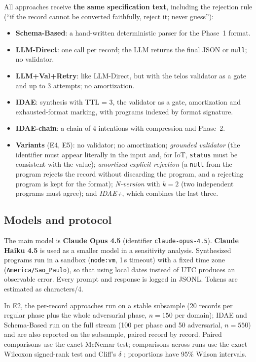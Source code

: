 \documentclass[sigconf,nonacm]{acmart}
\begin{document}
All approaches receive \textbf{the same specification text}, including the rejection rule (``if the record cannot be converted faithfully, reject it; never guess''):

\begin{itemize}
\item \textbf{Schema-Based}: a hand-written deterministic parser for the Phase~1 format.
\item \textbf{LLM-Direct}: one call per record; the LLM returns the final JSON or \texttt{null}; no validator.
\item \textbf{LLM+Val+Retry}: like LLM-Direct, but with the telos validator as a gate and up to 3 attempts; no amortization.
\item \textbf{IDAE}: synthesis with TTL = 3, the validator as a gate, amortization and exhausted-format marking, with programs indexed by format signature.
\item \textbf{IDAE-chain}: a chain of 4 intentions with compression and Phase~2.
\item \textbf{Variants} (E4, E5): no validator; no amortization; \textit{grounded validator} (the identifier must appear literally in the input and, for IoT, \texttt{status} must be consistent with the value); \textit{amortized explicit rejection} (a \texttt{null} from the program rejects the record without discarding the program, and a rejecting program is kept for the format); \textit{N-version} with $k=2$ (two independent programs must agree); and \textit{IDAE+}, which combines the last three.
\end{itemize}

\subsection{Models and protocol}

The main model is \textbf{Claude Opus 4.5} (identifier \texttt{claude-opus-4.5}). \textbf{Claude Haiku 4.5} is used as a smaller model in a sensitivity analysis. Synthesized programs run in a sandbox (\texttt{node:vm}, 1\,s timeout) with a fixed time zone (\texttt{America/\allowbreak Sao\_Paulo}), so that using local dates instead of UTC produces an observable error. Every prompt and response is logged in JSONL. Tokens are estimated as characters/4.

In E2, the per-record approaches run on a stable subsample (20 records per regular phase plus the whole adversarial phase, $n = 150$ per domain); IDAE and Schema-Based run on the full stream (100 per phase and 50 adversarial, $n = 550$) and are also reported on the subsample, paired record by record. Paired comparisons use the exact McNemar test; comparisons across runs use the exact Wilcoxon signed-rank test and Cliff's $\delta$ \cite{arcuri2011practical}; proportions have 95\% Wilson intervals.
\end{document}
